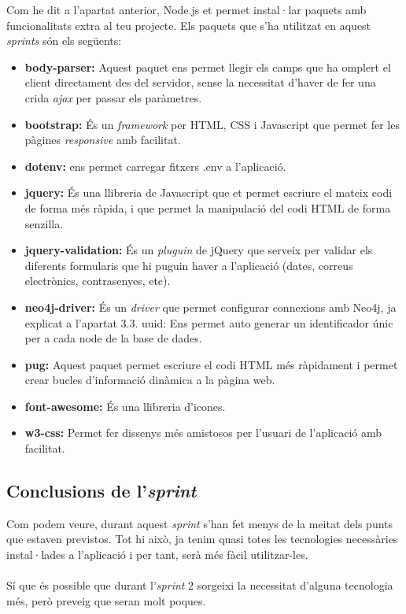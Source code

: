 \documentclass[11pt,catalan,listoffigures,listoftables]{tfgetsinf}
\begin{document}
Com he dit a l'apartat anterior, Node.js et permet instal·lar paquets amb funcionalitats extra al teu projecte. Els paquets que s'ha utilitzat en aquest \textit{sprints} són els següents:
\begin{itemize}
\item \textbf{body-parser:} Aquest paquet ens permet llegir els camps que ha omplert el client directament des del servidor, sense la necessitat d'haver de fer una crida \textit{ajax} per passar els paràmetres.
\item \textbf{bootstrap:} És un \textit{framework} per HTML, CSS i Javascript que permet fer les pàgines \textit{responsive} amb facilitat.
\item \textbf{dotenv:} ens permet carregar fitxers .env a l'aplicació.
\item \textbf{jquery:} És una llibreria de Javascript que et permet escriure el mateix codi de forma més ràpida, i que permet la manipulació del codi HTML de forma senzilla.
\item \textbf{jquery-validation:} És un \textit{pluguin} de jQuery que serveix per validar els diferents formularis que hi puguin haver a l'aplicació (dates, correus electrònics, contrasenyes, etc).
\item \textbf{neo4j-driver:} És un \textit{driver} que permet configurar connexions amb Neo4j, ja explicat a l'apartat 3.3.
uuid: Ens permet auto generar un identificador únic per a cada node de la base de dades.
\item \textbf{pug:} Aquest paquet permet escriure el codi HTML més ràpidament i permet crear bucles d'informació dinàmica a la pàgina web.
\item \textbf{font-awesome:} És una llibreria d'icones.
\item \textbf{w3-css:} Permet fer dissenys més amistosos per l'usuari de l'aplicació amb facilitat.

\end{itemize}

\subsection{Conclusions de l'\textit{sprint}}

Com podem veure, durant aquest \textit{sprint} s'han fet menys de la meitat dels punts que estaven previstos. Tot hi això, ja tenim quasi totes les tecnologies necessàries instal·lades a l'aplicació i per tant, serà més fàcil utilitzar-les.\\ \\
Sí que és possible que durant l'\textit{sprint} 2 sorgeixi la necessitat d'alguna tecnologia més, però preveig que seran molt poques.
\end{document}
